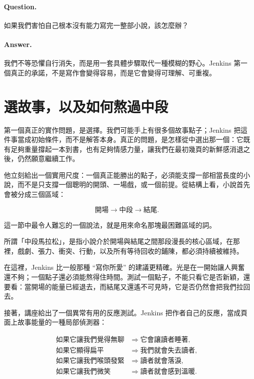 \paragraph{Question.} 如果我們害怕自己根本沒有能力寫完一整部小說，該怎麼辦？

\paragraph{Answer.} 我們不等恐懼自行消失，而是用一套具體步驟取代一種模糊的野心。Jenkins 第一個真正的承諾，不是寫作會變得容易，而是它會變得可理解、可重複。

\section{選故事，以及如何熬過中段}

第一個真正的實作問題，是選擇。我們可能手上有很多個故事點子；Jenkins 把這件事當成初始條件，而不是解答本身。真正的問題，是怎樣從中選出那一個：它既有足夠重量撐起一本到書，也有足夠情感力量，讓我們在最初幾頁的新鮮感消退之後，仍然願意繼續工作。

他立刻給出一個實用尺度：一個真正能勝出的點子，必須能支撐一部相當長度的小說，而不是只支撐一個聰明的開頭、一場戲，或一個前提。從結構上看，小說首先會被分成三個區域：

\begin{equation}
\text{開場} \to \text{中段} \to \text{結尾}.
\end{equation}

這一節中最令人難忘的一個說法，就是用來命名那塊最困難區域的詞。

\begin{definition}
所謂「中段馬拉松」，是指小說介於開場與結尾之間那段漫長的核心區域，在那裡，戲劇、張力、衝突、行動，以及所有等待回收的鋪陳，都必須持續被維持。
\end{definition}

在這裡，Jenkins 比一般那種 ``寫你所愛'' 的建議更精確。光是在一開始讓人興奮還不夠；一個點子還必須能熬得住時間。測試一個點子，不能只看它是否新穎，還要看：當開場的能量已經退去，而結尾又還遙不可見時，它是否仍然會把我們拉回去。

接著，講座給出了一個異常有用的反應測試。Jenkins 把作者自己的反應，當成頁面上故事能量的一種局部偵測器：

\begin{align}
\text{如果它讓我們覺得無聊} &\Rightarrow \text{它會讓讀者睡著},\\
\text{如果它顯得扁平} &\Rightarrow \text{我們就會失去讀者},\\
\text{如果它讓我們喉頭發緊} &\Rightarrow \text{讀者就會落淚},\\
\text{如果它讓我們微笑} &\Rightarrow \text{讀者就會感到溫暖}.
\end{align}

